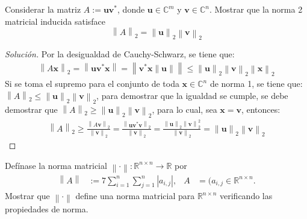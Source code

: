 \documentclass[12pt]{book}
\newcommand{\C}{\mathbb{C}}
\newcommand{\R}{\mathbb{R}}
\newcommand\norm[1]{\left\lVert#1\right\rVert}
\newcommand\abs[1]{\left\lvert#1\right\rvert}
\newenvironment{solucion}
  {\renewcommand\qedsymbol{$\square$}\begin{proof}[Solución]}
  {\end{proof}}
\begin{document}
\eje Considerar la matriz $A:=\bm{u}\bm{v}^*$, donde $\bm{u}\in\C^m$ y $\bm{v}\in\C^n$. Mostrar que la norma 2 matricial inducida satisface
\[
    \norm{A}_2=\norm{\bm{u}}_2\norm{\bm{v}}_2
\]
\begin{solucion}
    Por la desigualdad de Cauchy-Schwarz, se tiene que:
    \begin{align*}
        \norm{A\bm{x}}_2=\norm{\bm{u}\bm{v}^*\bm{x}}=\norm{\bm{v}^*\bm{x}\norm{\bm{u}}}\leq \norm{\bm{u}}_2\norm{\bm{v}}_2\norm{\bm{x}}_2
    \end{align*}
    Si se toma el supremo para el conjunto de toda $\bm{x}\in \C^n$ de norma 1, se tiene que: $\norm{A}_2\leq \norm{\bm{u}}_2\norm{\bm{v}}_2$, para demostrar que la igualdad se cumple, se debe demostrar que $\norm{A}_2\geq \norm{\bm{u}}_2\norm{\bm{v}}_2$, para lo cual, sea $\bm{x}=\bm{v}$, entonces:
    \begin{align*}
        \norm{A}_2\geq \frac{\norm{A\bm{v}}_2}{\norm{\bm{v}}_2}=\frac{\norm{\bm{u}\bm{v}^*\bm{v}}_2}{\norm{\bm{v}}_2}=\frac{\norm{\bm{u}}_2\norm{\bm{v}}^2_2}{\norm{\bm{v}}_2}=\norm{\bm{u}}_2\norm{\bm{v}}_2
    \end{align*}
\end{solucion}
\eje Defínase la norma matricial $\norm{\cdot}:\R^{n\times n}\rightarrow\R$ por
\begin{align*}
    \norm{A}&:=7\sum_{i=1}^n\sum_{j=1}^n\abs{a_{i,j}}, & A&=(a_{i,j}\in\R^{n\times n}.
\end{align*}
 Mostrar que $\norm{\cdot}$ define una norma matricial para $\R^{n\times n}$ verificando las propiedades de norma.
\end{document}
